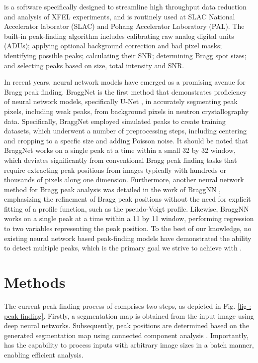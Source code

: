 \documentclass[a4paper]{article}
\begin{document}
\psocake{} is a software specifically designed to streamline high throughput
data reduction and analysis of XFEL experiments, and is routinely used at SLAC
National Accelerator laborator (SLAC) and Pohang Accelerator Laboratory (PAL).
The built-in peak-finding algorithm \citep{shinDataAnalysisUsing2018} includes
calibrating raw analog digital units (ADUs); applying optional background
correction and bad pixel masks; identifying possible peaks; calculating their
SNR; determining Bragg spot sizes; and selecting peaks based on size, total
intensity and SNR.

In recent years, neural network models have emerged as a promising avenue for
Bragg peak finding.  BraggNet \citep{sullivanBraggNetIntegratingBragg2019} is
the first method that demonstrates proficiency of neural network models,
specifically U-Net \citep{ronnebergerUNetConvolutionalNetworks2015}, in
accurately segmenting peak pixels, including weak peaks, from background pixels
in neutron crystallography data.  Specifically, BraggNet employed simulated
peaks to create training datasets, which underwent a number of preprocessing
steps, including centering and cropping to a specfic size and adding Poisson
noise.  It should be noted that BraggNet works on a single peak at a time within
a small 32 by 32 window, which deviates significantly from conventional Bragg
peak finding tasks that require extracting peak positions from images typically
with hundreds or thousands of pixels along one dimension.  Furthermore, another
neural network method for Bragg peak analysis was detailed in the work of
BraggNN \citep{liuBraggNNFastXray2021}, emphasizing the refinement of Bragg peak
positions without the need for explicit fitting of a profile function, such as
the pseudo-Voigt profile.  Likewise, BraggNN works on a single peak at a time
within a 11 by 11 window, performing regression to two variables representing
the peak position.  To the best of our knowledge, no existing neural network
based peak-finding models have demonstrated the ability to detect multiple peaks,
which is the primary goal we strive to achieve with \peaknet{}.


\section{Methods}

The current peak finding process of \peaknet{} comprises two steps, as depicted
in Fig. \ref{fig : peak finding}.  Firstly, a segmentation map is obtained from
the input image using deep neural networks.  Subsequently, peak positions are
determined based on the generated segmentation map using connected component
analysis \citep{weaverCentrosymmetricCrossSymmetricMatrices1985}.  Importantly,
\peaknet{} has the capability to process inputs with arbitrary image sizes in a
batch manner, enabling efficient analysis.
\end{document}
